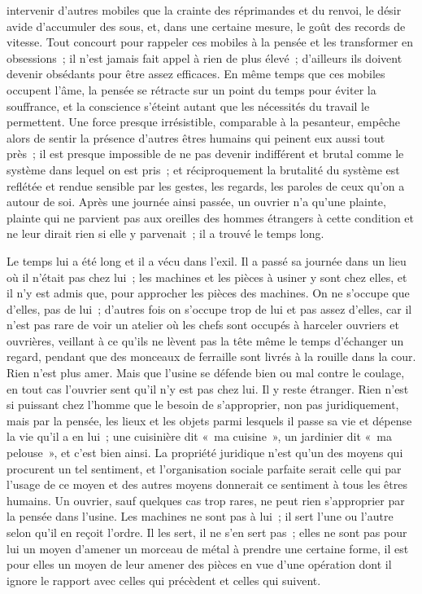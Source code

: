 \documentclass[french,twoside]{book} %
\begin{document}
intervenir d'autres mobiles que la crainte des réprimandes et du renvoi, le désir avide d'accumuler des sous, et, dans une certaine mesure, le goût des records de vitesse. Tout concourt pour rappeler ces mobiles à la pensée et les transformer en obsessions ; il n'est jamais fait appel à rien de plus élevé ; d'ailleurs ils doivent devenir obsédants pour être assez efficaces. En même temps que ces mobiles occupent l'âme, la pensée se rétracte sur un point du temps pour éviter la souffrance, et la conscience s'éteint autant que les nécessités du travail le permettent. Une force presque irrésistible, comparable à la pesanteur, empêche alors de sentir la présence d'autres êtres humains qui peinent eux aussi tout près ; il est presque impossible de ne pas devenir indifférent et brutal comme le système dans lequel on est pris ; et réciproquement la brutalité du système est reflétée et rendue sensible par les gestes, les regards, les paroles de ceux qu'on a autour de soi. Après une journée ainsi passée, un ouvrier n'a qu'une plainte, plainte qui ne parvient pas aux oreilles des hommes étrangers à cette condition et ne leur dirait rien si elle y parvenait ; il a trouvé le temps long.\par
Le temps lui a été long et il a vécu dans l'exil. Il a passé sa journée dans un lieu où il n'était pas chez lui ; les machines et les pièces à usiner y sont chez elles, et il n'y est admis que, pour approcher les pièces des machines. On ne s'occupe que d'elles, pas de lui ; d'autres fois on s'occupe trop de lui et pas assez d'elles, car il n'est pas rare de voir un atelier où les chefs sont occupés à harceler ouvriers et ouvrières, veillant à ce qu'ils ne lèvent pas la tête même le temps d'échanger un regard, pendant que des monceaux de ferraille sont livrés à la rouille dans la cour. Rien n'est plus amer. Mais que l'usine se défende bien ou mal contre le coulage, en tout cas l'ouvrier sent qu'il n'y est pas chez lui. Il y reste étranger. Rien n'est si puissant chez l'homme que le besoin de s'approprier, non pas juridiquement, mais par la pensée, les lieux et les objets parmi lesquels il passe sa vie et dépense la vie qu'il a en lui ; une cuisinière dit « ma cuisine », un jardinier dit « ma pelouse », et c'est bien ainsi. La propriété juridique n'est qu'un des moyens qui procurent un tel sentiment, et l'organisation sociale parfaite serait celle qui par l'usage de ce moyen et des autres moyens donnerait ce sentiment à tous les êtres humains. Un ouvrier, sauf quelques cas trop rares, ne peut rien s'approprier par la pensée dans l'usine. Les machines ne sont pas à lui ; il sert l'une ou l'autre selon qu'il en reçoit l'ordre. Il les sert, il ne s'en sert pas ; elles ne sont pas pour lui un moyen d'amener un morceau de métal à prendre une certaine forme, il est pour elles un moyen de leur amener des pièces en vue d'une opération dont il ignore le rapport avec celles qui précèdent et celles qui suivent.\par
\end{document}
